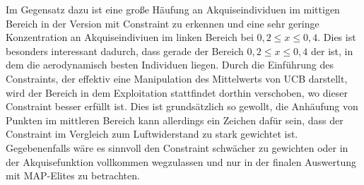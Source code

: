 Im Gegensatz dazu ist eine große Häufung an Akquiseindividuen im mittigen Bereich in der Version mit Constraint zu erkennen
und eine sehr geringe Konzentration an Akquiseindiviuen im linken Bereich bei $0,2 \leq x \leq 0,4$.
Dies ist besonders interessant dadurch, dass gerade der Bereich $0,2 \leq x \leq 0,4$ der ist, in dem die aerodynamisch besten Individuen liegen.
Durch die Einführung des Constraints, der effektiv eine Manipulation des Mittelwerts von UCB darstellt, wird der Bereich in dem Exploitation stattfindet dorthin verschoben, wo dieser Constraint besser erfüllt ist.
Dies ist grundsätzlich so gewollt, die Anhäufung von Punkten im mittleren Bereich kann allerdings ein Zeichen dafür sein, dass der Constraint im Vergleich zum Luftwiderstand zu stark gewichtet ist.
Gegebenenfalls wäre es sinnvoll den Constraint schwächer zu gewichten oder in der Akquisefunktion vollkommen wegzulassen und nur in der finalen Auswertung mit MAP-Elites zu betrachten.

\newcommand{\wheelcasepheno}[3]{
	\begin{figure}[h]
		\centering
		\begin{subfigure}[t]{0.5\textwidth}
			\centering
			\texttt{[image: bilder/6pt1000Samples/\#1-uncon-top.png]}
			\subcaption{oben, ohne Constraint, $c_D$=#2}
		\end{subfigure}\hfill
		\begin{subfigure}[t]{0.5\textwidth}
			\centering
			\texttt{[image: bilder/6pt1000Samples/\#1-uncon-angled.png]}
			\subcaption{perspektivisch, ohne Constraint}
		\end{subfigure}
		\begin{subfigure}[b]{0.5\textwidth}
			\centering
			\texttt{[image: bilder/6pt1000Samples/\#1-con-top.png]}
			\subcaption{oben, mit Constraint, $c_D$=#3}
		\end{subfigure}\hfill
		\begin{subfigure}[b]{0.5\textwidth}
			\centering
			\texttt{[image: bilder/6pt1000Samples/\#1-con-angled.png]}
			\subcaption{perspektivisch, mit Constraint}
		\end{subfigure}
		\caption{Die Phänotypen des Individuums (#1) mit und ohne Constraint}
		\label{fig:wheelcasepheno#1}
	\end{figure}
}

\newcommand{\wref}[1]{
	\cref{fig:wheelcasepheno#1}
}


